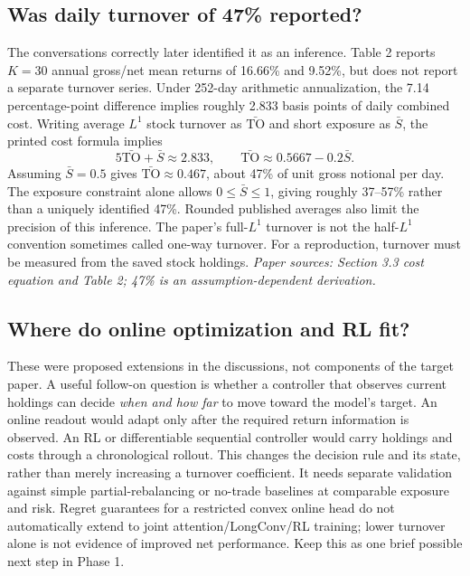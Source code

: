 \documentclass[11pt]{article}
\begin{document}
\subsection{Was daily turnover of 47\% reported?}

The conversations correctly later identified it as an inference. Table 2
reports $K=30$ annual gross/net mean returns of 16.66\% and 9.52\%, but
does not report a separate turnover series. Under 252-day arithmetic
annualization, the 7.14 percentage-point difference implies roughly
2.833 basis points of daily combined cost. Writing average $L^1$ stock
turnover as $\bar{\mathrm{TO}}$ and short exposure as $\bar S$, the
printed cost formula implies
\[
5\bar{\mathrm{TO}}+\bar S\approx2.833,
\qquad
\bar{\mathrm{TO}}\approx0.5667-0.2\bar S.
\]
Assuming $\bar S=0.5$ gives $\bar{\mathrm{TO}}\approx0.467$, about
47\% of unit gross notional per day. The exposure constraint alone
allows $0\leq\bar S\leq1$, giving roughly 37--57\% rather than a
uniquely identified 47\%. Rounded published averages also limit the
precision of this inference. The paper's full-$L^1$ turnover is not the
half-$L^1$ convention sometimes called one-way turnover. For a
reproduction, turnover must be measured from the saved stock holdings.
\emph{Paper sources: Section 3.3 cost equation and Table 2; 47\% is
an assumption-dependent derivation.}

\subsection{Where do online optimization and RL fit?}

These were proposed extensions in the discussions, not components of
the target paper. A useful follow-on question is whether a controller
that observes current holdings can decide \emph{when and how far} to
move toward the model's target. An online readout would adapt only after
the required return information is observed. An RL or differentiable
sequential controller would carry holdings and costs through a
chronological rollout. This changes the decision rule and its state,
rather than merely increasing a turnover coefficient. It needs separate
validation against simple partial-rebalancing or no-trade baselines at
comparable exposure and risk. Regret guarantees for a restricted convex
online head do not automatically extend to joint attention/LongConv/RL
training; lower turnover alone is not evidence of improved net performance.
Keep this as one brief possible next step in Phase 1.
\end{document}

